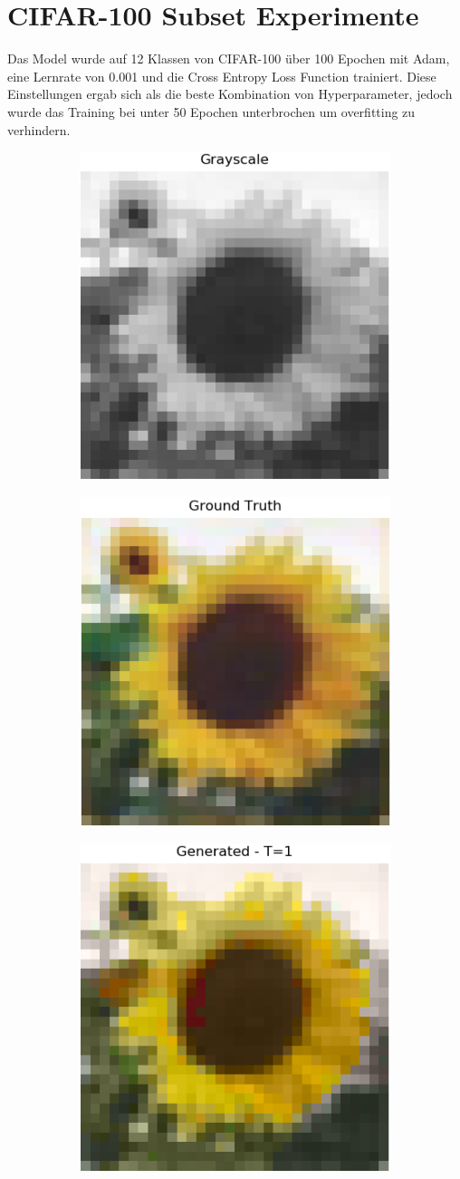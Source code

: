 \section{CIFAR-100 Subset Experimente}
Das Model wurde auf 12 Klassen von CIFAR-100 über 100 Epochen mit Adam, eine Lernrate von 0.001 und die Cross Entropy Loss Function
trainiert. Diese Einstellungen ergab sich als die beste Kombination von Hyperparameter, jedoch wurde das Training bei unter 50 Epochen unterbrochen
um overfitting zu verhindern.

\begin{figure}[H]
  \centering
  \vspace{1cm}
  \begin{subfigure}
    \centering
    \includegraphics[width=.24\textwidth]{resources/experiments/cifar/200_grayscale.png}
  \end{subfigure}
  \begin{subfigure}
    \centering
    \includegraphics[width=.24\textwidth]{resources/experiments/cifar/200_original.png}
  \end{subfigure}
  \begin{subfigure}
    \centering
    \includegraphics[width=.24\textwidth]{resources/experiments/cifar/200_t1.png}
  \end{subfigure}


\end{figure}
